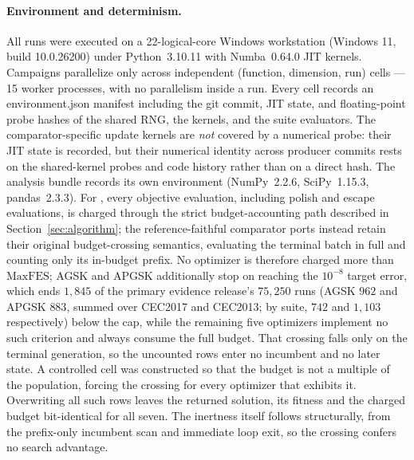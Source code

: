 \paragraph{Environment and determinism.}
All runs were executed on a 22-logical-core Windows workstation
(Windows 11, build 10.0.26200) under Python~3.10.11 with Numba~0.64.0
JIT kernels. Campaigns parallelize only across independent
(function, dimension, run) cells --- 15 worker processes, with no parallelism
inside a run. Every cell records an environment.json
manifest including the git commit, JIT state, and floating-point
probe hashes of the shared RNG, the \dtgsk{} kernels, and the suite
evaluators. The comparator-specific update kernels are \emph{not} covered
by a numerical probe: their JIT state is recorded, but their numerical
identity across producer commits rests on the shared-kernel probes and code
history rather than on a direct hash.
The analysis bundle records its own environment (NumPy~2.2.6,
SciPy~1.15.3, pandas~2.3.3).
For \dtgsk{}, every objective evaluation, including polish and escape
evaluations, is charged through the strict budget-accounting path
described in Section~\ref{sec:algorithm}; the reference-faithful
comparator ports instead retain their original budget-crossing
semantics, evaluating the terminal batch in full and counting only its
in-budget prefix. No optimizer is therefore charged more than
$\mathrm{MaxFES}$; AGSK and APGSK additionally stop on reaching the
$10^{-8}$ target error, which ends $1{,}845$ of the primary evidence
release's $75{,}250$ runs
(AGSK $962$ and APGSK $883$, summed over CEC2017 and CEC2013; by suite,
$742$ and $1{,}103$ respectively) below the cap, while
the remaining five optimizers implement no such criterion and always consume
the full budget. That crossing falls only on the terminal
generation, so the uncounted rows enter no incumbent and no later state.
A controlled cell was constructed so that the budget is not a multiple of the
population, forcing the crossing for every optimizer that exhibits it.
Overwriting all such rows leaves the returned solution, its fitness and the
charged budget bit-identical for all seven. The inertness itself follows
structurally, from the prefix-only incumbent scan and immediate loop exit, so
the crossing confers no search advantage.
